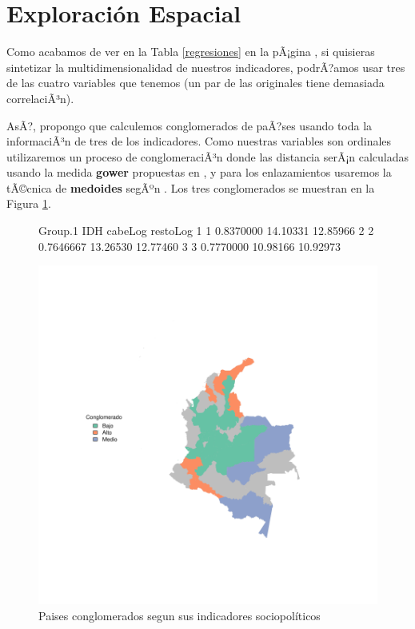 \section{Exploración Espacial}\label{espacial}



Como acabamos de ver en la Tabla \ref{regresiones} en la pÃ¡gina \pageref{regresiones}, si quisieras sintetizar la multidimensionalidad de nuestros indicadores, podrÃ?amos usar tres de las cuatro variables que tenemos (un par de las originales tiene demasiada correlaciÃ³n). 

AsÃ?, propongo que calculemos conglomerados de paÃ?ses usando toda la informaciÃ³n de tres de los indicadores. Como nuestras variables son ordinales utilizaremos un proceso de conglomeraciÃ³n donde las distancia serÃ¡n calculadas usando la medida {\bf gower} propuestas en \cite{gower_general_1971}, y para los enlazamientos usaremos la tÃ©cnica de {\bf medoides} segÃºn \cite{reynolds_clustering_2006}. Los tres conglomerados se muestran en la Figura \ref{clustmap}.






\begin{figure}[h]
\begin{Schunk}
\begin{Soutput}
  Group.1       IDH  cabeLog restoLog
1       1 0.8370000 14.10331 12.85966
2       2 0.7646667 13.26530 12.77460
3       3 0.7770000 10.98166 10.92973
\end{Soutput}
\end{Schunk}
\includegraphics{espacial-plotMap1}
\caption{Paises conglomerados segun sus indicadores sociopolíticos}\label{clustmap}
\end{figure}


\endinput
